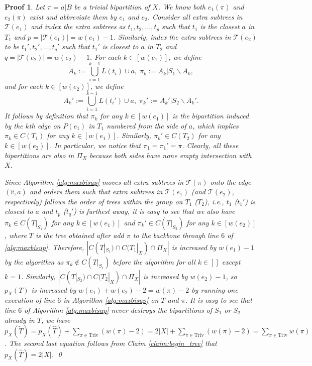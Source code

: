 \documentclass{bmcart}
\newcommand{\triv}{\mathrm{Triv}}
\theoremstyle{mystyle}
\theoremstyle{proofstyle}
\newtheorem*{proof2}{Proof}
\newenvironment{proofnospace}{\begin{proof2}}{\qed \end{proof2}}
\begin{document}
\claimAfterAddTrivial*
\begin{proofnospace}
    Let $\pi = a|B$ be a trivial bipartition of $X$. We know both $e_1(\pi)$ and $e_2(\pi)$ exist and abbreviate them by $e_1$ and $e_2$. Consider all extra subtrees in $\mathcal{T}(e_1)$ and index the extra subtrees as $t_1, t_2, \dots, t_p$ such that $t_1$ is the closest $a$ in $T_1$ and $p = |\mathcal{T}(e_1)| = w(e_1)-1$. Similarly, index the extra subtrees in $\mathcal{T}(e_2)$ to be $t_1', t_2', \dots, t_q'$ such that $t_1'$ is closest to $a$ in $T_2$ and $q = |\mathcal{T}(e_2)| = w(e_2)-1$. For each $k \in [w(e_1)]$, we define
    \[A_k := \bigcup_{i = 1}^{k-1} L(t_i) \cup a, \; \pi_k := A_k | S_1 \backslash A_k,\]
    and for each $k \in [w(e_2)]$, we define
    \[A_k' := \bigcup_{i = 1}^{k-1} L(t_i') \cup a,\; \pi_k' := A_k' | S_2 \backslash A_k'.\]
    It follows by definition that $\pi_k$ for any $k \in [w(e_1)]$ is the bipartition induced by the $k$th edge on $P(e_1)$ in $T_1$ numbered from the side of $a$, which implies $\pi_k \in C(T_1)$ for any $k \in [w(e_1)]$. Similarly, $\pi_k' \in C(T_2)$ for any $k\in[w(e_2)]$. In particular, we notice that $\pi_1 = \pi_1' = \pi$. Clearly, all these bipartitions are also in $\Pi_X$ because both sides have none empty intersection with $X$.\smallskip

    Since Algorithm \ref{alg:maxbisup} moves all extra subtrees in $\mathcal{T}(\pi)$ onto the edge $(\hat{v},a)$ and orders them such that extra subtrees in $\mathcal{T}(e_1)$ (and $\mathcal{T}(e_2)$, respectively) follows the order of trees within the group on $T_1$ ($T_2$), i.e., $t_1$ ($t_1'$) is closest to $a$ and $t_p$ ($t_q'$) is furthest away, it is easy to see that we also have $\pi_k \in C(T|_{S_1})$ for any $k \in [w(e_1)]$ and $\pi_k' \in C(T|_{S_2})$ for any $k \in [w(e_2)]$, where $T$ is the tree obtained after add $\pi$ to the backbone through line $6$ of \ref{alg:maxbisup}. Therefore, $|C(T|_{S_1}) \cap C(T_1|_X) \cap \Pi_X|$ is increased by $w(e_1)-1$ by the algorithm as $\pi_k \notin C(T|_{S_1})$ before the algorithm for all $k \in []$ except $k=1$. Similarly, $|C(T|_{S_2}) \cap C(T_2|_X) \cap \Pi_X|$ is increased by $w(e_2)-1$, so $p_X(T)$ is increased by $w(e_1)+w(e_2)-2 = w(\pi)-2$ by running one execution of line $6$ in Algorithm \ref{alg:maxbisup} on $T$ and $\pi$. It is easy to see that line $6$ of Algorithm \ref{alg:maxbisup} never destroys the bipartitions of $S_1$ or $S_2$ already in $T$, we have $p_X(\tilde{T}) = p_X(\hat{T}) + \sum_{\pi \in \triv} (w(\pi) -2) = 2|X| + \sum_{\pi \in \triv} (w(\pi) - 2) = \sum_{\pi \in \triv} w(\pi)$. The second last equation follows from Claim \ref{claim:begin_tree} that $p_X(\hat{T}) = 2|X|$.
\end{proofnospace}
\end{document}
